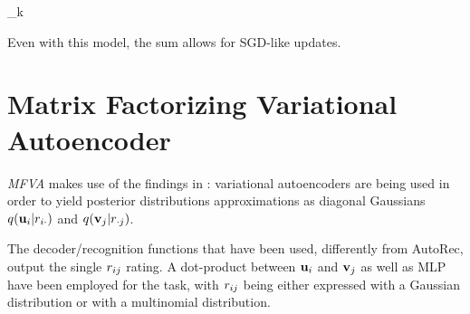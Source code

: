 \begin{nalign}
\min \sum_{k} 
    \ltwonorm{
    \left[\boldrk - \Dec{\Enc{\boldrk}} \right]
    \odot
    \maskk
}
\end{nalign}

Even with this model, the sum allows for SGD-like updates.

\section{Matrix Factorizing Variational Autoencoder}
\emph{MFVA} \cite{vanBaalen2016} makes use of the findings in \cite{1312.6114}:
variational autoencoders are being used in order to yield
posterior distributions approximations as diagonal Gaussians 
$q(\mathbf{u}_i|r_{i\cdot})$ and $q(\mathbf{v}_j|r_{\cdot j})$.

The decoder/recognition functions that have been used, differently from AutoRec,
output the single $r_{ij}$ rating. A dot-product between $\mathbf{u}_i$ and $\mathbf{v}_j$
as well as MLP have been employed for the task, with $r_{ij}$ being
either expressed with a Gaussian distribution or with a multinomial distribution.

